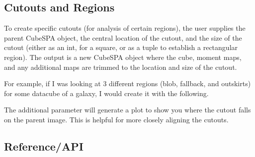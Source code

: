 \documentclass[letterpaper,10pt,english]{sphinxmanual}
\begin{document}
\subsection{Cutouts and Regions}
\label{\detokenize{getting_started:cutouts-and-regions}}
\sphinxAtStartPar
To create specific cutouts (for analysis of certain regions), the user supplies the parent CubeSPA object,
the central location of the cutout, and the size of the cutout (either as an int, for a square, or as a
tuple to establish a rectangular region). The output is a new CubeSPA object where the cube, moment maps,
and any additional maps are trimmed to the location and size of the cutout.

\sphinxAtStartPar
For example, if I was looking at 3 different regions (blob, fallback, and outskirts) for some datacube of a
galaxy, I would create it with the following.

\begin{sphinxVerbatim}[commandchars=\\\{\}]
      
       
       
\end{sphinxVerbatim}

\sphinxAtStartPar
The additional parameter  will generate a plot to show you where the cutout falls on the parent
image. This is helpful for more closely aligning the cutouts.


\subsection{Reference/API}
\label{\detokenize{getting_started:module-cubespa.cubespa}}\label{\detokenize{getting_started:reference-api}}
\end{document}
